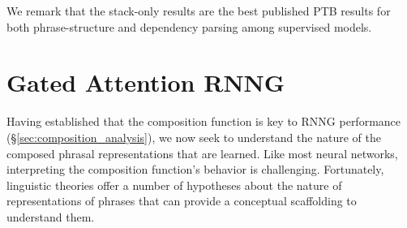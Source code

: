\documentclass[11pt]{article}
\newcommand{\cjd}[1]{\textcolor{cyan}{{\textbf{[#1 --\textsc{cjd}]}}}}
\newcommand{\nascomment}[1]{\textcolor{blue}{{\textbf{[#1 --\textsc{nas}]}}}}
\renewcommand{\cjd}[1]{}
\renewcommand{\nascomment}[1]{}
\begin{document}
\begin{table}[h]
\begin{center}
\end{center}
\caption{Language modeling:  perplexity. IKN refers to Kneser-Ney 5-gram LM.
\label{tab:ppl}}
\end{table}%

 
We remark that the stack-only results are the best published PTB results for both phrase-structure and dependency parsing among supervised models.
 
\section{Gated Attention RNNG}\label{sec:ga_rnng}


Having established that the composition function is key to RNNG performance 
 (\S\ref{sec:composition_analysis}), we now seek to understand the nature of the composed phrasal representations that are learned. Like most neural networks, interpreting the composition function's behavior is challenging. Fortunately, linguistic theories offer a number of hypotheses about the nature of representations of phrases that can provide a conceptual scaffolding to understand them.
\end{document}
